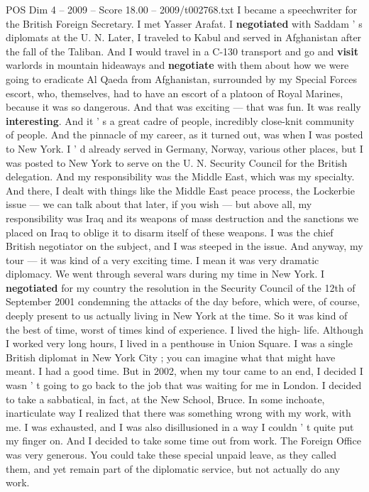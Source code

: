 \begin{textsample}{POS Dim 4 – 2009 – Score 18.00 – 2009/t002768.txt}
I became a speechwriter for the British Foreign Secretary.
I met Yasser Arafat.
I \textbf{negotiated} with Saddam ' s diplomats at the U.
N.
Later, I traveled to Kabul and served in Afghanistan after the fall of the Taliban.
And I would travel in a C-130 transport and go and \textbf{visit} warlords in mountain hideaways and \textbf{negotiate} with them about how we were going to eradicate Al Qaeda from Afghanistan, surrounded by my Special Forces escort, who, themselves, had to have an escort of a platoon of Royal Marines, because it was so dangerous.
And that was exciting — that was fun.
It was really \textbf{interesting}.
And it ' s a great cadre of people, incredibly close-knit community of people.
And the pinnacle of my career, as it turned out, was when I was posted to New York.
I ' d already served in Germany, Norway, various other places, but I was posted to New York to serve on the U.
N.
Security Council for the British delegation.
And my responsibility was the Middle East, which was my specialty.
And there, I dealt with things like the Middle East peace process, the Lockerbie issue — we can talk about that later, if you wish — but above all, my responsibility was Iraq and its weapons of mass destruction and the sanctions we placed on Iraq to oblige it to disarm itself of these weapons.
I was the chief British negotiator on the subject, and I was steeped in the issue.
And anyway, my tour — it was kind of a very exciting time.
I mean it was very dramatic diplomacy.
We went through several wars during my time in New York.
I \textbf{negotiated} for my country the resolution in the Security Council of the 12th of September 2001 condemning the attacks of the day before, which were, of course, deeply present to us actually living in New York at the time.
So it was kind of the best of time, worst of times kind of experience.
I lived the high- life.
Although I worked very long hours, I lived in a penthouse in Union Square.
I was a single British diplomat in New York City ; you can imagine what that might have meant.
I had a good time.
But in 2002, when my tour came to an end, I decided I wasn ' t going to go back to the job that was waiting for me in London.
I decided to take a sabbatical, in fact, at the New School, Bruce.
In some inchoate, inarticulate way I realized that there was something wrong with my work, with me.
I was exhausted, and I was also disillusioned in a way I couldn ' t quite put my finger on.
And I decided to take some time out from work.
The Foreign Office was very generous.
You could take these special unpaid leave, as they called them, and yet remain part of the diplomatic service, but not actually do any work.

\end{textsample}

